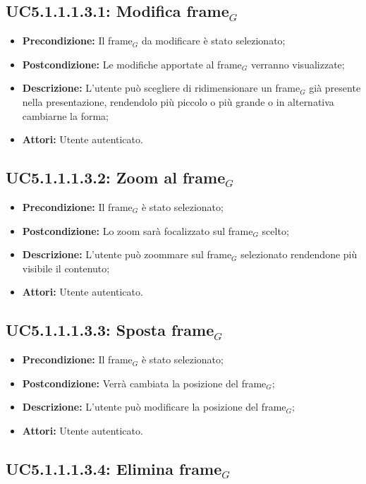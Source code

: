 \subsection{ UC5.1.1.1.3.1: Modifica frame$_G$}

\begin{itemize}
	\item \textbf{Precondizione:} Il frame$_G$ da modificare è stato selezionato;
	\item \textbf{Postcondizione:} Le modifiche apportate al frame$_G$ verranno visualizzate;
	\item \textbf{Descrizione:} L'utente può scegliere di ridimensionare un frame$_G$ già presente nella presentazione, rendendolo più piccolo o più grande o in alternativa cambiarne la forma;
	\item \textbf{Attori:} Utente autenticato.
\end{itemize}
\subsection{ UC5.1.1.1.3.2: Zoom al frame$_G$}

\begin{itemize}
	\item \textbf{Precondizione:} Il frame$_G$ è stato selezionato;
	\item \textbf{Postcondizione:} Lo zoom sarà focalizzato sul frame$_G$ scelto;
	\item \textbf{Descrizione:} L'utente può zoommare sul frame$_G$ selezionato rendendone più visibile il contenuto;
	\item \textbf{Attori:} Utente autenticato.
\end{itemize}
\subsection{ UC5.1.1.1.3.3: Sposta frame$_G$}

\begin{itemize}
	\item \textbf{Precondizione:} Il frame$_G$ è stato selezionato;
	\item \textbf{Postcondizione:} Verrà cambiata la posizione del frame$_G$;
	\item \textbf{Descrizione:} L'utente può modificare la posizione del frame$_G$;
	\item \textbf{Attori:} Utente autenticato.
\end{itemize}
\subsection{ UC5.1.1.1.3.4: Elimina frame$_G$}

